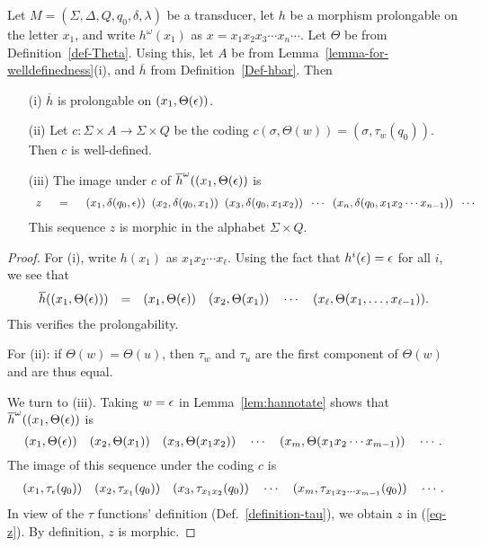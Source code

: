 \begin{lemma}\label{lem:state_annotated_is_morphic}
  Let $M = (\Sigma, \Delta, Q, q_0, \delta, \lambda)$ be a  transducer, 
  let $h$ be a morphism prolongable on the letter $x_1$,   
  and write $h^\omega(x_1)$ as  $x = x_1x_2x_3\cdots x_n \cdots$.
 Let $\Theta$ be from Definition~\ref{def-Theta}.  Using this,
 let  $A$ be  from
 Lemma~\ref{lemma-for-welldefinedness}(i), and
  $\overline{h}$ from Definition~\ref{Def-hbar}.    Then
  \begin{enumerate}
  \item[(i)]  $\overline{h}$ is prolongable on  
$(x_1, \Theta(\epsilon))$. 
  \item[(ii)]   Let   $c: \Sigma \times A \to \Sigma \times Q$ be the coding 
$c(\sigma, \Theta(w)) = (\sigma, \tau_w(q_0))$.
    Then $c$ is well-defined.
\item[(iii)]  The image under $c$ of $\overline{h}^\omega((x_1, \Theta(\epsilon))$
is
  \begin{equation}
    \begin{array}{lcl}
  z & \;\;=\;\; & (x_1, \delta(q_0, \epsilon))\;\;
  (x_2, \delta(q_0, x_1))\;\;
  (x_3, \delta(q_0, x_1x_2))\;\;\cdots\;\; (x_n, \delta(q_0, x_1x_2\cdots x_{n-1}))
  \;\;\cdots
  \end{array}
  \label{eq-z}
  \end{equation}
This sequence $z$ is morphic in the alphabet $\Sigma \times Q$.
  \end{enumerate}
\end{lemma}


\begin{proof}
For (i),   write $h(x_1)$ as $ x_1 x_2 \cdots x_\ell$.
Using the fact that $h^i(\epsilon) = \epsilon$ for all $i$, we see that
$$ 
\begin{array}{lcl}
\overline{h}((x_1, \Theta(\epsilon))) & = & (x_1, \Theta(\epsilon)) 
\quad
  (x_2, \Theta(x_1)) \quad \cdots 
  \quad (x_{\ell}, \Theta(x_1,\ldots, x_{\ell -1})).
\end{array}
$$
This verifies the prolongability.

For (ii): if $\Theta(w) = \Theta(u)$,
  then $\tau_w$ and $\tau_u$ are the first component of $\Theta(w)$ and are thus equal.



We turn to (iii).
Taking $w = \epsilon$ in Lemma~\ref{lem:hannotate} shows that  $\overline{h}^\omega((x_1, \Theta(\epsilon))$ is
$$(x_1, \Theta(\epsilon)) \quad (x_2, \Theta(x_1))
\quad (x_3, \Theta(x_1 x_2)) \quad \cdots \quad
(x_m, \Theta(x_1 x_2\cdots x_{m-1})) \quad \cdots .
$$
The image of this sequence under the coding $c$ is 
$$\begin{array}{lcl}
  (x_1, \tau_{\epsilon}(q_0)) \quad (x_2, \tau_{x_1}(q_0))
  \quad (x_3, \tau_{x_1 x_2}(q_0))\quad \cdots\quad
  (x_m, \tau_{x_1 x_2\cdots x_{m-1}}(q_0)) \quad \cdots .
\end{array}
$$
In view of the  $\tau$ functions' definition (Def.~\ref{definition-tau}), we obtain $z$ in
 (\ref{eq-z}).
By definition,   $z$ is   morphic. 
\end{proof}

